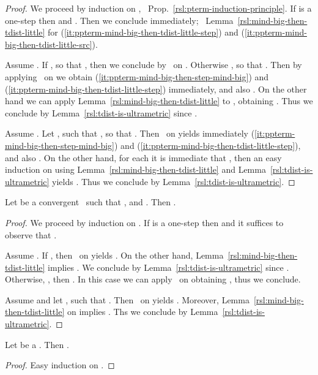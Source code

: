\begin{proof}
We proceed by induction on , \confer\ Prop.~\ref{rsl:pterm-induction-principle}.
If  is a one-step then  and .
Then we conclude immediately; \confer\ Lemma~\ref{rsl:mind-big-then-tdist-little} for (\ref{it:ppterm-mind-big-then-tdist-little-step}) and (\ref{it:ppterm-mind-big-then-tdist-little-src}).

Assume .
If , so that , then we conclude by \ih\ on .
Otherwise , so that . Then by applying \ih\ on  we obtain (\ref{it:ppterm-mind-big-then-step-mind-big}) and (\ref{it:ppterm-mind-big-then-tdist-little-step}) immediately, and also .
On the other hand we can apply Lemma~\ref{rsl:mind-big-then-tdist-little} to , obtaining . Thus we conclude by Lemma~\ref{rsl:tdist-is-ultrametric} since .

Assume . Let ,  such that , so that .
Then \ih\ on  yields immediately (\ref{it:ppterm-mind-big-then-step-mind-big}) and (\ref{it:ppterm-mind-big-then-tdist-little-step}), and also .
On the other hand, for each  it is immediate that , then an easy induction on  using Lemma~\ref{rsl:mind-big-then-tdist-little} and Lemma~\ref{rsl:tdist-is-ultrametric} yields . Thus we conclude by Lemma~\ref{rsl:tdist-is-ultrametric}.
\end{proof}


\begin{lemma}
\label{rsl:ppterm-mind-big-then-tdist-little-tgt}
Let  be a convergent \ppterm\ such that , and .
Then .
\end{lemma}

\begin{proof}
We proceed by induction on .
If  is a one-step then  and it suffices to observe that .

Assume .
If , then \ih\ on  yields .
On the other hand, Lemma~\ref{rsl:mind-big-then-tdist-little} implies .
We conclude by Lemma~\ref{rsl:tdist-is-ultrametric} since .
Otherwise, , then .
In this case we can apply \ih\ on  obtaining , thus we conclude.

Assume  and let ,  such that .
Then \ih\ on  yields .
Moreover, Lemma~\ref{rsl:mind-big-then-tdist-little} on  implies . Ths we conclude by Lemma~\ref{rsl:tdist-is-ultrametric}.
\end{proof}

\begin{lemma}
\label{rsl:ppterm-src}
Let  be a \ppterm. Then .
\end{lemma}

\begin{proof}
Easy induction on .
\end{proof}

